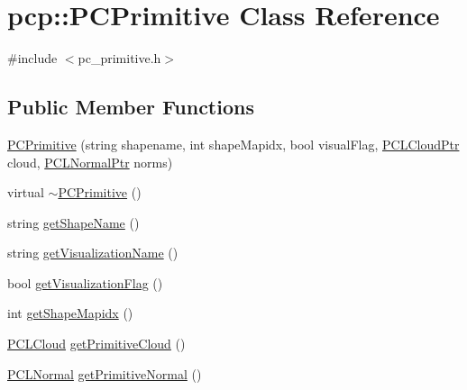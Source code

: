 \hypertarget{classpcp_1_1PCPrimitive}{\section{pcp\-:\-:P\-C\-Primitive Class Reference}
\label{classpcp_1_1PCPrimitive}
}


{\ttfamily \#include $<$pc\-\_\-primitive.\-h$>$}

\subsection*{Public Member Functions}
\begin{DoxyCompactItemize}
\item 
\hyperlink{classpcp_1_1PCPrimitive_a00c270f938ac1f76c1252422e1f1424f}{P\-C\-Primitive} (string shapename, int shape\-Mapidx, bool visual\-Flag, \hyperlink{pc__primitive_8h_aa14a240c8d999c4f56133c0f70e88783}{P\-C\-L\-Cloud\-Ptr} cloud, \hyperlink{pc__primitive_8h_a1bc38ce8b0c26e5f2d28fae9f3e3ea97}{P\-C\-L\-Normal\-Ptr} norms)
\item 
virtual \hyperlink{classpcp_1_1PCPrimitive_a3a4da7e50a67144bc1b5b4dfd376b72e}{$\sim$\-P\-C\-Primitive} ()
\item 
string \hyperlink{classpcp_1_1PCPrimitive_a9f507218fd4c442d0daa4938e2e71c10}{get\-Shape\-Name} ()
\item 
string \hyperlink{classpcp_1_1PCPrimitive_ae6a97bc88b8cc7e83476413c73e01aeb}{get\-Visualization\-Name} ()
\item 
bool \hyperlink{classpcp_1_1PCPrimitive_ad92a83f976c6aac8125c7c8997633f21}{get\-Visualization\-Flag} ()
\item 
int \hyperlink{classpcp_1_1PCPrimitive_a1251deb8c39370d0ed5e7d2c7290063f}{get\-Shape\-Mapidx} ()
\item 
\hyperlink{pc__primitive_8h_a02a7c0cdfcd324f1b5b87ce549fdbe10}{P\-C\-L\-Cloud} \hyperlink{classpcp_1_1PCPrimitive_ac774df2f9bb393e9a1491da1b0131d4f}{get\-Primitive\-Cloud} ()
\item 
\hyperlink{pc__primitive_8h_abe81b5e6ffcc0ceb1b95b0489419027d}{P\-C\-L\-Normal} \hyperlink{classpcp_1_1PCPrimitive_aafdd30869b5e09e394d70efebe5eac2a}{get\-Primitive\-Normal} ()
\end{DoxyCompactItemize}
